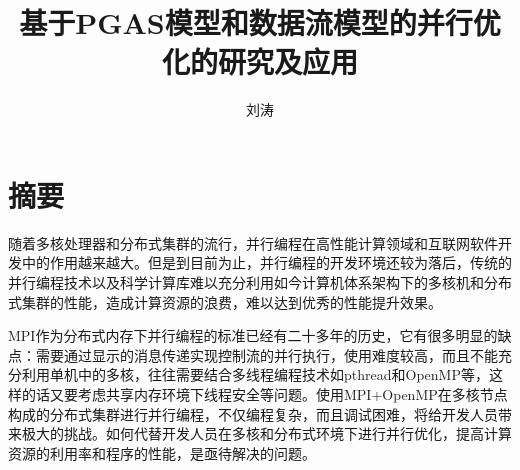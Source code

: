 \confidential{}%
\title{基于PGAS模型和数据流模型的并行优化的研究及应用}%
\author{刘涛}%
\maketitle
\makeenglishtitle
\makedeclaration
\chapter*{摘\quad 要}
\setcounter{page}{1}%

随着多核处理器和分布式集群的流行，并行编程在高性能计算领域和互联网软件开发中的作用越来越大。但是到目前为止，并行编程的开发环境还较为落后，传统的并行编程技术以及科学计算库难以充分利用如今计算机体系架构下的多核机和分布式集群的性能，造成计算资源的浪费，难以达到优秀的性能提升效果。

MPI作为分布式内存下并行编程的标准已经有二十多年的历史，它有很多明显的缺点：需要通过显示的消息传递实现控制流的并行执行，使用难度较高，而且不能充分利用单机中的多核，往往需要结合多线程编程技术如pthread和OpenMP等，这样的话又要考虑共享内存环境下线程安全等问题。使用MPI+OpenMP在多核节点构成的分布式集群进行并行编程，不仅编程复杂，而且调试困难，将给开发人员带来极大的挑战。如何代替开发人员在多核和分布式环境下进行并行优化，提高计算资源的利用率和程序的性能，是亟待解决的问题。

